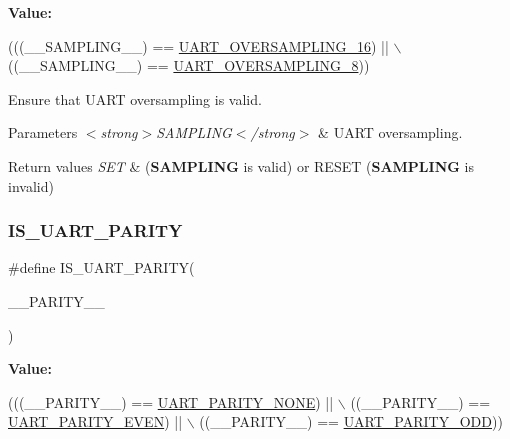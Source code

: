{\bfseries Value\+:}
\begin{DoxyCode}
(((\_\_SAMPLING\_\_) == \hyperlink{group___u_a_r_t___over___sampling_gaa6a320ec65d248d76f21de818db1a2f0}{UART\_OVERSAMPLING\_16}) || \(\backslash\)
                                            ((\_\_SAMPLING\_\_) == 
      \hyperlink{group___u_a_r_t___over___sampling_gaeb13896e8bdc1bb041e01a86a868ee0b}{UART\_OVERSAMPLING\_8}))
\end{DoxyCode}


Ensure that U\+A\+RT oversampling is valid. 


\begin{DoxyParams}{Parameters}
{\em $<$strong$>$\+S\+A\+M\+P\+L\+I\+N\+G$<$/strong$>$} & U\+A\+RT oversampling. \\
\hline
\end{DoxyParams}

\begin{DoxyRetVals}{Return values}
{\em S\+ET} & ({\bfseries S\+A\+M\+P\+L\+I\+NG} is valid) or R\+E\+S\+ET ({\bfseries S\+A\+M\+P\+L\+I\+NG} is invalid) \\
\hline
\end{DoxyRetVals}
\mbox{\label{group___u_a_r_t___private___macros_ga57b0798bfa43d210f492eb3c5e218a86}} 
\subsubsection{\texorpdfstring{I\+S\+\_\+\+U\+A\+R\+T\+\_\+\+P\+A\+R\+I\+TY}{IS\_UART\_PARITY}}
{\footnotesize\ttfamily \#define I\+S\+\_\+\+U\+A\+R\+T\+\_\+\+P\+A\+R\+I\+TY(\begin{DoxyParamCaption}\item[{}]{\+\_\+\+\_\+\+P\+A\+R\+I\+T\+Y\+\_\+\+\_\+ }\end{DoxyParamCaption})}

{\bfseries Value\+:}
\begin{DoxyCode}
(((\_\_PARITY\_\_) == \hyperlink{group___u_a_r_t___parity_ga270dea6e1a92dd83fe58802450bdd60c}{UART\_PARITY\_NONE}) || \(\backslash\)
                                    ((\_\_PARITY\_\_) == \hyperlink{group___u_a_r_t___parity_ga063b14ac42ef9e8f4246c17a586b14eb}{UART\_PARITY\_EVEN}) || \(\backslash\)
                                    ((\_\_PARITY\_\_) == \hyperlink{group___u_a_r_t___parity_ga229615e64964f68f7a856ea6ffea359e}{UART\_PARITY\_ODD}))
\end{DoxyCode}


